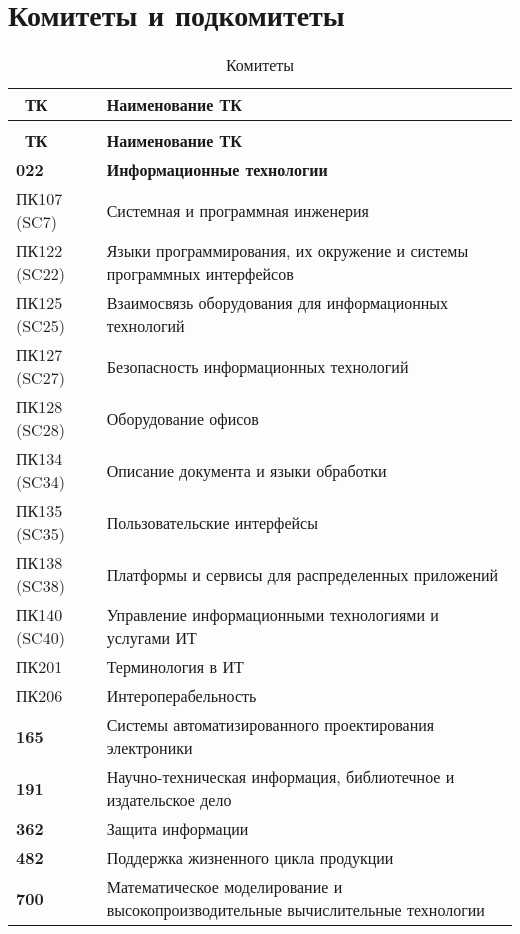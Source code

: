 \section{Комитеты и подкомитеты}

\begin{longtable}{|p{2cm}|p{14cm}|}
	\caption{Комитеты} \label{table:tk} \\
	\hline
	\textbf{\No\ ТК}
	& \textbf{Наименование ТК} \\
	\hline
	\endfirsthead
	\conttable{table:tk} \\
	\hline
	\textbf{\No\ ТК}
	& \textbf{Наименование ТК} \\
	\hline
	\endhead
	\textbf{022} & \textbf{Информационные технологии} \\ \hline
	ПК107 (SC7) & Системная и программная инженерия \\ \hline
	ПК122 (SC22)
	& Языки программирования, их окружение
	и системы программных интерфейсов \\ \hline
	ПК125 (SC25)
	& Взаимосвязь оборудования для информационных технологий \\ \hline
	ПК127 (SC27) & Безопасность информационных технологий \\ \hline
	ПК128 (SC28) & Оборудование офисов \\ \hline
	ПК134 (SC34) & Описание документа и языки обработки \\ \hline
	ПК135 (SC35) & Пользовательские интерфейсы \\ \hline
	ПК138 (SC38) & Платформы и сервисы для распределенных приложений \\ \hline
	ПК140 (SC40)
	& Управление информационными технологиями и услугами ИТ \\ \hline
	ПК201 & Терминология в ИТ \\ \hline
	ПК206 & Интероперабельность \\ \hline
	\textbf{165}
	& Системы автоматизированного проектирования электроники \\ \hline
	\textbf{191}
	& Научно-техническая информация, библиотечное и издательское дело \\ \hline
	\textbf{362}
	& Защита информации \\ \hline
	\textbf{482}
	& Поддержка жизненного цикла продукции \\ \hline
	\textbf{700}
	& Математическое моделирование
		и высокопроизводительные вычислительные технологии \\ \hline
\end{longtable}

